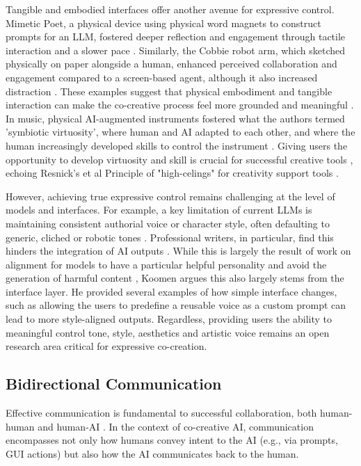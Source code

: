 Tangible and embodied interfaces offer another avenue for expressive control. Mimetic Poet, a physical device using physical word magnets to construct prompts for an LLM, fostered deeper reflection and engagement through tactile interaction and a slower pace \cite{McCormack2024-gv}. Similarly, the Cobbie robot arm, which sketched physically on paper alongside a human, enhanced perceived collaboration and engagement compared to a screen-based agent, although it also increased distraction \cite{Lin2020-ji}. These examples suggest that physical embodiment and tangible interaction can make the co-creative process feel more grounded and meaningful \cite{McCormack2024-gv, Lin2020-ji}. In music, physical AI-augmented instruments fostered what the authors termed 'symbiotic virtuosity', where human and AI adapted to each other, and where the human increasingly developed skills to control the instrument \cite{Blanchard2024-jz}. Giving users the opportunity to develop virtuosity and skill is crucial for successful creative tools \cite{Lee2024-tu}, echoing Resnick's et al Principle of "high-celings" for creativity support tools \cite{Resnick2005-fs}. 

However, achieving true expressive control remains challenging at the level of models and interfaces. For example, a key limitation of current LLMs is maintaining consistent authorial voice or character style, often defaulting to generic, cliched or robotic tones \cite{Ippolito2022-mf, Yuan2022-kb, Chakrabarty2024-ov}. Professional writers, in particular, find this hinders the integration of AI outputs \cite{Ippolito2022-mf, Grigis2024-pf}. While this is largely the result of work on alignment for models to have a particular helpful personality and avoid the generation of harmful content \cite{Anthropic2024-ne, Ouyang2022-af, Bai2022-ec}, Koomen \cite{Koomen2025-eu} argues this also largely stems from the interface layer. He provided several examples of how simple interface changes, such as allowing the users to predefine a reusable voice as a custom prompt can lead to more style-aligned outputs. Regardless, providing users the ability to meaningful control tone, style, aesthetics and artistic voice remains an open research area critical for expressive co-creation.

\subsection{Bidirectional Communication}

Effective communication is fundamental to successful collaboration, both human-human and human-AI \cite{Mamykina2002-lm, Rezwana2022-gg}. In the context of co-creative AI, communication encompasses not only how humans convey intent to the AI (e.g., via prompts, GUI actions) but also how the AI communicates back to the human.

